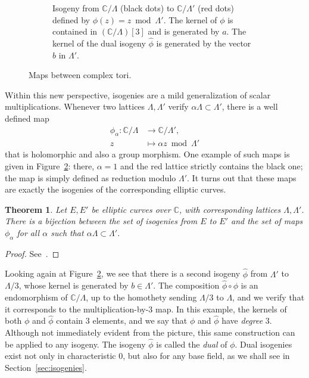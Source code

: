 \documentclass[10pt]{article}
\theoremstyle{plain}
\newtheorem{theorem}{Theorem}
\theoremstyle{definition}
\begin{document}
\begin{figure}
\begin{subfigure}{.45\textwidth}
    
    \caption{Isogeny from $ℂ/Λ$ (black dots) to $ℂ/Λ'$ (red dots)
      defined by $ϕ(z)=z \bmod Λ'$. The kernel of $ϕ$ is contained
      in $(ℂ/Λ)[3]$ and is generated by $a$. The kernel of the dual
      isogeny $\hat{ϕ}$ is generated by the vector $b$ in $Λ'$.}
    \label{fig:isogeny}
  \end{subfigure}
  
  \caption{Maps between complex tori.}
\end{figure}

Within this new perspective, isogenies are a mild generalization of
scalar multiplications. %
Whenever two lattices $Λ,Λ'$ verify $αΛ⊂Λ'$, there is a well defined
map
\begin{align*}
   ϕ_α : ℂ/Λ &\to ℂ/Λ',\\
  z &\mapsto αz \bmod Λ'
\end{align*}
that is holomorphic and also a group morphism. %
One example of such maps is given in Figure~\ref{fig:isogeny}: there,
$α=1$ and the red lattice strictly contains the black one; the map is
simply defined as reduction modulo $Λ'$. %
It turns out that these maps are exactly the isogenies of the
corresponding elliptic curves.

\begin{theorem}
  Let $E,E'$ be elliptic curves over $ℂ$, with corresponding lattices
  $Λ,Λ'$. %
  There is a bijection between the set of isogenies from $E$ to $E'$
  and the set of maps $ϕ_α$ for all $α$ such that $αΛ⊂Λ'$.
\end{theorem}
\begin{proof}
  See~\cite[VI, Th.~4.1]{silverman:elliptic}.
\end{proof}

Looking again at Figure~\ref{fig:isogeny}, we see that there is a
second isogeny $\hat{ϕ}$ from $Λ'$ to $Λ/3$, whose kernel is generated
by $b∈Λ'$. %
The composition $\hat{ϕ}∘ϕ$ is an endomorphism of $ℂ/Λ$, up to the
homothety sending $Λ/3$ to $Λ$, and we verify that it corresponds to
the multiplication-by-$3$ map. %
In this example, the kernels of both $ϕ$ and $\hat{ϕ}$ contain $3$
elements, and we say that $ϕ$ and $\hat{ϕ}$ have \emph{degree} $3$. %
Although not immediately evident from the picture, this same
construction can be applied to any isogeny. %
The isogeny $\hat{ϕ}$ is called the \emph{dual} of $ϕ$. %
Dual isogenies exist not only in characteristic $0$, but also for any
base field, as we shall see in Section~\ref{sec:isogenies}.
\end{document}
